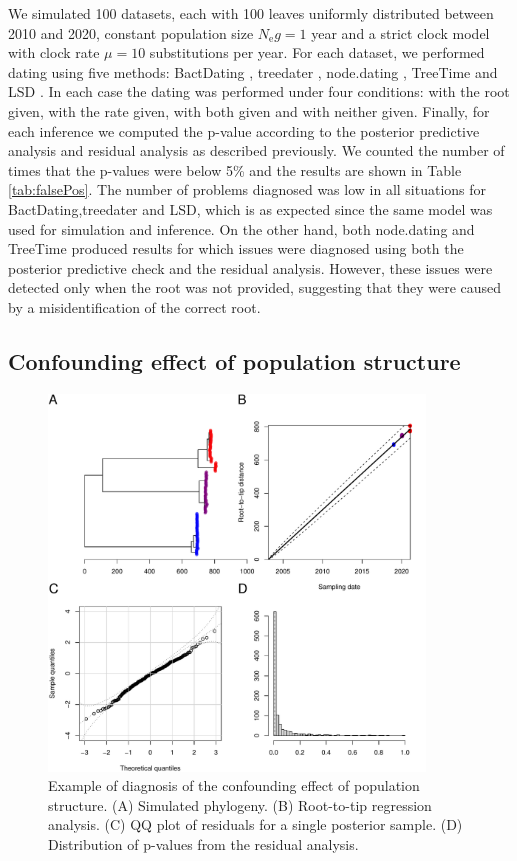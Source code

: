 \documentclass{article}
\begin{document}
We simulated 100 datasets, each with 100 leaves 
uniformly distributed between 2010 and 2020, 
constant population size $N_\mathrm{e}g=1$ year and 
a strict clock model with  clock rate $\mu=10$ substitutions per year.
For each dataset, we performed dating using five methods: 
BactDating \citep{Didelot2018}, treedater \citep{Volz2017},
node.dating \citep{Jones2017}, TreeTime \citep{Sagulenko2018} and LSD \citep{To2016}.
In each case the dating was performed under four conditions:
with the root given, with the rate given, with both given and with neither given.
Finally, for each inference we computed the p-value according to the posterior
predictive analysis and residual analysis as described previously. We counted the number
of times that the p-values were below 5\% and the results are shown in 
Table \ref{tab:falsePos}. The number of problems diagnosed was low in all situations
for BactDating,treedater and LSD, which is as expected since the same model was used
for simulation and inference. 
On the other hand, both node.dating and TreeTime
produced results for which issues were diagnosed using
both the posterior predictive check and the residual analysis. However, these
issues were detected only when the root was not provided, suggesting that they
were caused by a misidentification of the correct root. 

\subsection*{Confounding effect of population structure} 

\begin{figure}[p!]
\begin{center}
\includegraphics[width=10cm]{confounding-case.pdf}
\end{center}
\caption{Example of diagnosis of the confounding effect of population structure.
(A) Simulated phylogeny. 
(B) Root-to-tip regression analysis.
(C) QQ plot of residuals for a single posterior sample.
(D) Distribution of p-values from the residual analysis.
\label{fig:confounding}}
\end{figure}
\end{document}
